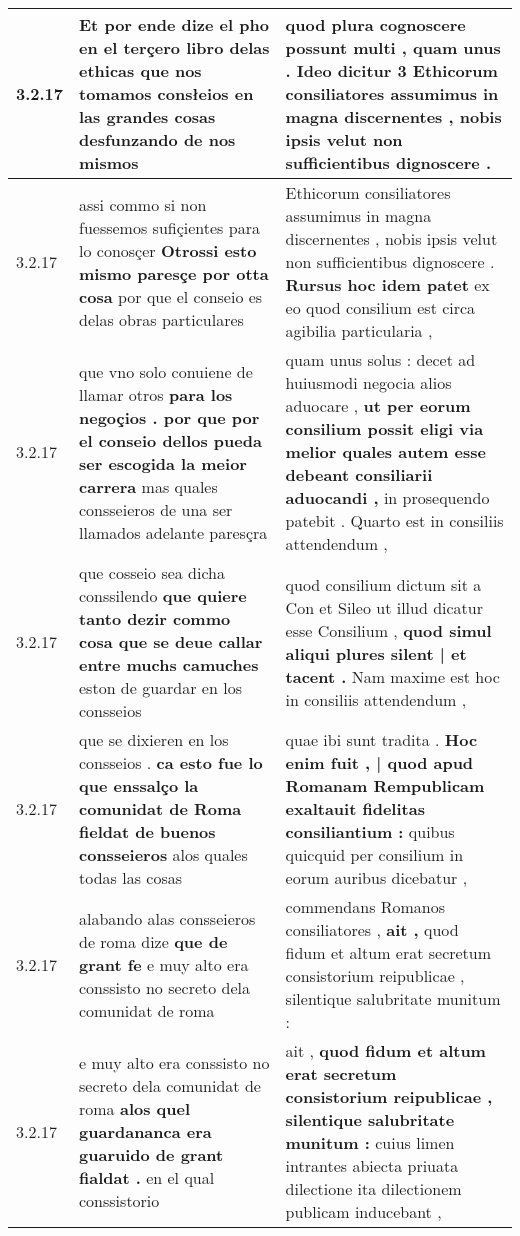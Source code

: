 \begin{tabular}{|p{1cm}|p{6.5cm}|p{6.5cm}|}
3.2.17 & Et por ende dize el pho en el terçero libro delas ethicas \textbf{ que nos tomamos consłeios en las grandes cosas } desfunzando de nos mismos & quod plura cognoscere possunt multi , \textbf{ quam unus . Ideo dicitur 3 } Ethicorum consiliatores assumimus in magna discernentes , nobis ipsis velut non sufficientibus dignoscere . \\\hline
3.2.17 & assi commo si non fuessemos sufiçientes para lo conosçer \textbf{ Otrossi esto mismo paresçe por otta cosa } por que el conseio es delas obras particulares & Ethicorum consiliatores assumimus in magna discernentes , nobis ipsis velut non sufficientibus dignoscere . \textbf{ Rursus hoc idem patet } ex eo quod consilium est circa agibilia particularia , \\\hline
3.2.17 & que vno solo conuiene de llamar otros \textbf{ para los negoçios . por que por el conseio dellos pueda ser escogida la meior carrera } mas quales consseieros de una ser llamados adelante paresçra & quam unus solus : decet ad huiusmodi negocia alios aduocare , \textbf{ ut per eorum consilium possit eligi via melior quales autem esse debeant consiliarii aduocandi , } in prosequendo patebit . Quarto est in consiliis attendendum , \\\hline
3.2.17 & que cosseio sea dicha conssilendo \textbf{ que quiere tanto dezir commo cosa que se deue callar entre muchs camuches } eston de guardar en los consseios & quod consilium dictum sit a Con et Sileo ut illud dicatur esse Consilium , \textbf{ quod simul aliqui plures silent | et tacent . } Nam maxime est hoc in consiliis attendendum , \\\hline
3.2.17 & que se dixieren en los consseios . \textbf{ ca esto fue lo que enssalço la comunidat de Roma fieldat de buenos consseieros } alos quales todas las cosas & quae ibi sunt tradita . \textbf{ Hoc enim fuit , | quod apud Romanam Rempublicam exaltauit fidelitas consiliantium : } quibus quicquid per consilium in eorum auribus dicebatur , \\\hline
3.2.17 & alabando alas consseieros de roma dize \textbf{ que de grant fe } e muy alto era conssisto no secreto dela comunidat de roma & commendans Romanos consiliatores , \textbf{ ait , } quod fidum et altum erat secretum consistorium reipublicae , silentique salubritate munitum : \\\hline
3.2.17 & e muy alto era conssisto no secreto dela comunidat de roma \textbf{ alos quel guardananca era guaruido de grant fialdat . } en el qual conssistorio & ait , \textbf{ quod fidum et altum erat secretum consistorium reipublicae , silentique salubritate munitum : } cuius limen intrantes abiecta priuata dilectione ita dilectionem publicam inducebant , \\\hline

\end{tabular}

